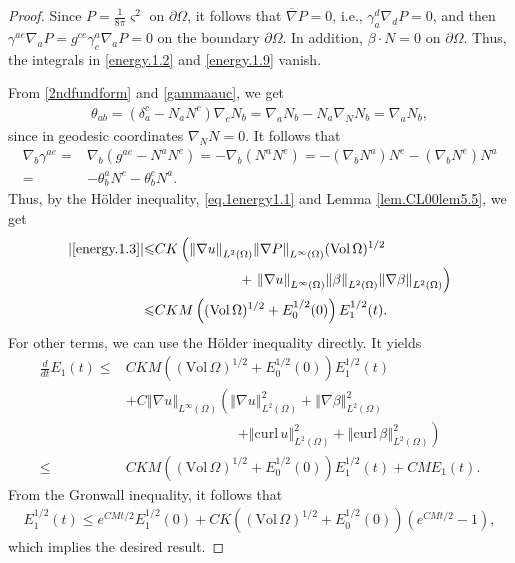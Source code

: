 \documentclass[12pt,reqno]{amsart}
\numberwithin{equation}{section}
\theoremstyle{definition}
\theoremstyle{remark}
\begin{document}
\begin{proof}
  Since ${P }=\frac{1}{8\pi}{\varsigma}^2$ on ${\partial}\Omega$, it follows that ${\overline{\nabla}} {P }=0$, i.e., $\gamma_a^d{\nabla}_d {P }=0$, and then $\gamma^{ae}{\nabla}_a {P }=g^{ce}\gamma_c^a{\nabla}_a {P }=0$ on the boundary ${\partial}\Omega$. In addition,  $\beta\cdot N=0$ on ${\partial}\Omega$. Thus, the integrals in \eqref{energy.1.2} and \eqref{energy.1.9} vanish.

  From \eqref{2ndfundform} and \eqref{gammaauc}, we get
  \begin{align}
    \theta_{ab}=(\delta_a^c-N_aN^c){\nabla}_c N_b={\nabla}_a N_b-N_a{\nabla}_N N_b={\nabla}_a N_b,
  \end{align}
  since in geodesic coordinates ${\nabla}_N N=0$. It follows that
  \begin{align*}
    {\nabla}_b\gamma^{ae}=&{\nabla}_b (g^{ae}-N^aN^e)=-{\nabla}_b(N^aN^e)=-({\nabla}_b N^a)N^e-({\nabla}_b N^e)N^a\\
    =&-\theta_b^a N^e-\theta_b^eN^a.
  \end{align*}
  Thus,  by the H\"older inequality, \eqref{eq.1energy1.1} and Lemma \ref{lem.CL00lem5.5}, we get
  \begin{align*}
    |\eqref{energy.1.3}|{\leqslant} &CK\left({\left\Vert{{\nabla} u}\right\Vert}_{L^2(\Omega)}{\left\Vert{{\nabla} {P }}\right\Vert}_{L^\infty(\Omega)}({\mathrm{Vol}\,}\Omega)^{1/2}\right.\\
    &\qquad\qquad\qquad+\left.{\left\Vert{{\nabla} u}\right\Vert}_{L^\infty(\Omega)}{\left\Vert{\beta}\right\Vert}_{L^2(\Omega)}{\left\Vert{{\nabla} \beta}\right\Vert}_{L^2(\Omega)}\right)\\
    {\leqslant}& CK M\left(({\mathrm{Vol}\,}\Omega)^{1/2}+ E_0^{1/2}(0)\right)E_1^{1/2}(t).
  \end{align*}
  For other terms, we can use the H\"older inequality directly. It yields
  \begin{align*}
    \frac{d}{dt}E_1(t){\leqslant} &CK M\left(({\mathrm{Vol}\,}\Omega)^{1/2}+ E_0^{1/2}(0)\right)E_1^{1/2}(t)\\
    &+C{\left\Vert{{\nabla} u}\right\Vert}_{L^\infty(\Omega)}\left({\left\Vert{{\nabla} u}\right\Vert}_{L^2(\Omega)}^2+{\left\Vert{{\nabla} \beta}\right\Vert}_{L^2(\Omega)}^2\right.\\
    &\qquad\qquad\qquad\qquad \left.+{\left\Vert{{\mathrm{curl}\,} u}\right\Vert}_{L^2(\Omega)}^2+{\left\Vert{{\mathrm{curl}\,}\beta}\right\Vert}_{L^2(\Omega)}^2\right)\\
    {\leqslant}&C K M\left(({\mathrm{Vol}\,}\Omega)^{1/2}+ E_0^{1/2}(0)\right)E_1^{1/2}(t)
    +CM E_1(t).
  \end{align*}
  From the Gronwall inequality, it follows that
  \begin{align*}
    E_1^{1/2}(t){\leqslant} e^{CMt/2}E_1^{1/2}(0)+C K\left(({\mathrm{Vol}\,}\Omega)^{1/2}+ E_0^{1/2}(0)\right)\left(e^{CMt/2}-1\right),
  \end{align*}
  which implies the desired result.
\end{proof}
\end{document}
